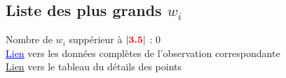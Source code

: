 \documentclass[a4paper, 9pt]{report}
\begin{document}
                 \newpage
                                \subsection{Liste des plus grands $w_i$}
                                \hypertarget{tableau_plusG_wi}{}
                                Nombre de $w_i$ suppérieur à $|\textbf{\textcolor{red}{3.5}}|$  : 0\\            
                                \hyperlink{tableau_obs}{\textcolor{blue}{\underline{Lien}}} vers les données complètes de l'observation correspondante\\
                                \hyperlink{tableau_details_points}{Lien} vers le tableau du détails des points\\
                    
\end{document}
